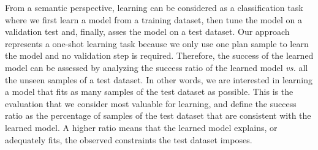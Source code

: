 \documentclass{ecai}
\newcommand{\eff}{\mathsf{eff}}    %
\newcommand{\cond}{\mathsf{cond}}  %
\newcommand{\dur}{\mathsf{dur}}    %
\newcommand{\supp}{\mathsf{sup}}   %
\newcommand{\tim}{\mathsf{time}}   %
\newcommand{\reqs}{\mathsf{req\_{start}}} %
\newcommand{\reqe}{\mathsf{req\_{end}}}   %
\begin{document}
From a semantic perspective, learning can be considered as a classification task where we first learn a model from a training dataset, then tune the model on a validation test and, finally, asses the model on a test dataset. Our approach represents a one-shot learning task because we only use one plan sample to learn the model and no validation step is required.
Therefore, the success of the learned model can be assessed by analyzing the success ratio of the learned model \emph{vs.} all the unseen samples of a test dataset. In other words, we are interested in learning a model that fits as many samples of the test dataset as possible. This is the evaluation that we consider most valuable for learning, and define the success ratio as the percentage of samples of the test dataset that are consistent with the learned model. A higher ratio means that the learned model explains, or adequately fits, the observed constraints the test dataset imposes.

\end{document}
